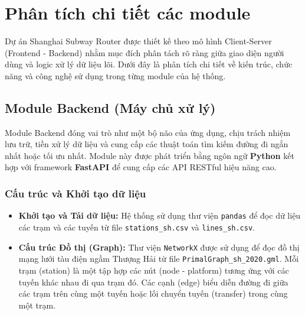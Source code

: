 \documentclass[12pt,a4paper]{article}
\begin{document}
\section{Phân tích chi tiết các module}

Dự án Shanghai Subway Router được thiết kế theo mô hình Client-Server (Frontend - Backend) nhằm mục đích phân tách rõ ràng giữa giao diện người dùng và logic xử lý dữ liệu lõi. Dưới đây là phân tích chi tiết về kiến trúc, chức năng và công nghệ sử dụng trong từng module của hệ thống.

\subsection{Module Backend (Máy chủ xử lý)}

Module Backend đóng vai trò như một bộ não của ứng dụng, chịu trách nhiệm lưu trữ, tiền xử lý dữ liệu và cung cấp các thuật toán tìm kiếm đường đi ngắn nhất hoặc tối ưu nhất. Module này được phát triển bằng ngôn ngữ \textbf{Python} kết hợp với framework \textbf{FastAPI} để cung cấp các API RESTful hiệu năng cao.

\subsubsection{Cấu trúc và Khởi tạo dữ liệu}
\begin{itemize}
    \item \textbf{Khởi tạo và Tải dữ liệu:} Hệ thống sử dụng thư viện \texttt{pandas} để đọc dữ liệu các trạm và các tuyến từ file \texttt{stations\_sh.csv} và \texttt{lines\_sh.csv}.
    \item \textbf{Cấu trúc Đồ thị (Graph):} Thư viện \texttt{NetworkX} được sử dụng để đọc đồ thị mạng lưới tàu điện ngầm Thượng Hải từ file \texttt{PrimalGraph\_sh\_2020.gml}. Mỗi trạm (station) là một tập hợp các nút (node - platform) tương ứng với các tuyến khác nhau đi qua trạm đó. Các cạnh (edge) biểu diễn đường đi giữa các trạm trên cùng một tuyến hoặc lối chuyển tuyến (transfer) trong cùng một trạm.
\end{itemize}
\end{document}
